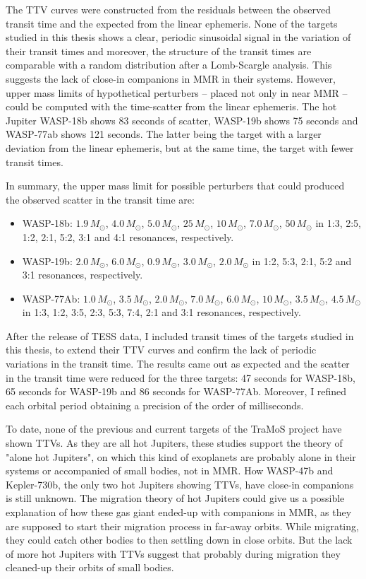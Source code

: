 The TTV curves were constructed from the residuals between the observed transit time and the expected from the linear ephemeris. None of the targets studied in this thesis shows a clear, periodic sinusoidal signal in the variation of their transit times and moreover, the structure of the transit times are comparable with a random distribution after a Lomb-Scargle analysis. This suggests the lack of close-in companions in MMR in their systems. However, upper mass limits of hypothetical perturbers -- placed not only in near MMR -- could be computed with the time-scatter from the linear ephemeris. The hot Jupiter WASP-18b shows 83 seconds of scatter, WASP-19b shows 75 seconds and WASP-77ab shows 121 seconds. The latter being the target with a larger deviation from the linear ephemeris, but at the same time, the target with fewer transit times.

In summary, the upper mass limit for possible perturbers that could produced the observed scatter in the transit time are:
\begin{itemize}
\item WASP-18b: $1.9\,M_{\odot}$, $4.0\,M_{\odot}$, $5.0\,M_{\odot}$, $25\,M_{\odot}$, $10\,M_{\odot}$, $7.0\,M_{\odot}$, $50\,M_{\odot}$ in 1:3, 2:5, 1:2, 2:1, 5:2, 3:1 and 4:1 resonances, respectively. 
\item WASP-19b: $2.0\,M_{\odot}$, $6.0\,M_{\odot}$, $0.9\,M_{\odot}$, $3.0\,M_{\odot}$, $2.0\,M_{\odot}$ in 1:2, 5:3, 2:1, 5:2 and 3:1 resonances, respectively. 
\item WASP-77Ab: $1.0\,M_{\odot}$, $3.5\,M_{\odot}$, $2.0\,M_{\odot}$, $7.0\,M_{\odot}$, $6.0\,M_{\odot}$, $10\,M_{\odot}$, $3.5\,M_{\odot}$, $4.5\,M_{\odot}$ in 1:3, 1:2, 3:5, 2:3, 5:3, 7:4, 2:1 and 3:1 resonances, respectively.
\end{itemize}

After the release of TESS data, I included transit times of the targets studied in this thesis, to extend their TTV curves and confirm the lack of periodic variations in the transit time. The results came out as expected and the scatter in the transit time were reduced for the three targets: 47 seconds for WASP-18b, 65 seconds for WASP-19b and 86 seconds for WASP-77Ab. Moreover, I refined each orbital period obtaining a precision of the order of milliseconds. 

To date, none of the previous and current targets of the TraMoS project have shown TTVs. As they are all hot Jupiters, these studies support the theory of "alone hot Jupiters", on which this kind of exoplanets are probably alone in their systems or accompanied of small bodies, not in MMR. How WASP-47b and Kepler-730b, the only two hot Jupiters showing TTVs, have close-in companions is still unknown. The migration theory of hot Jupiters could give us a possible explanation of how these gas giant ended-up with companions in MMR, as they are supposed to start their migration process in far-away orbits. While migrating, they could catch other bodies to then settling down in close orbits. But the lack of more hot Jupiters with TTVs suggest that probably during migration they cleaned-up their orbits of small bodies. 

